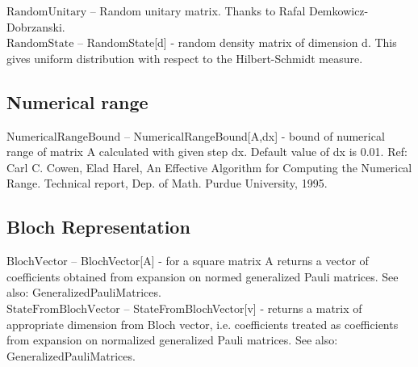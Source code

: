 \noindent\textbf{$ \text{RandomUnitary} $ }-- Random unitary matrix. Thanks to Rafal Demkowicz-Dobrzanski.$  $\\[6pt]

\noindent\textbf{$ \text{RandomState} $ }-- RandomState[d] - random density matrix of dimension d. This gives uniform distribution with respect to the Hilbert-Schmidt measure.$  $\\[6pt]

\subsection{Numerical range}

\noindent\textbf{$ \text{NumericalRangeBound} $ }-- NumericalRangeBound[A,dx] - bound of numerical range of matrix A calculated with given step dx. Default value of dx is 0.01. Ref: Carl C. Cowen, Elad Harel, An Effective Algorithm for Computing the Numerical Range. Technical report, Dep. of Math. Purdue University, 1995.$  $\\[6pt]

\subsection{Bloch Representation}

\noindent\textbf{$ \text{BlochVector} $ }-- BlochVector[A] - for a square matrix A returns a vector of coefficients obtained from expansion on normed generalized Pauli matrices. See also: GeneralizedPauliMatrices.$  $\\[6pt]

\noindent\textbf{$ \text{StateFromBlochVector} $ }-- StateFromBlochVector[v] - returns a matrix of appropriate dimension from Bloch vector, i.e. coefficients treated as coefficients from expansion on normalized generalized Pauli matrices. See also: GeneralizedPauliMatrices.$  $\\[6pt]



